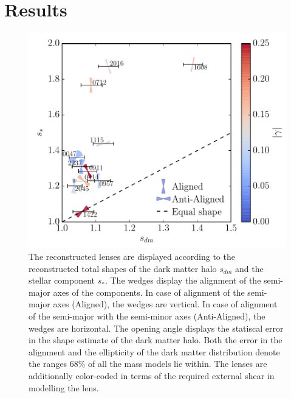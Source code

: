 \documentclass[useAMS,usenatbib]{mn2e}
\begin{document}
\section{Results}\label{sec:results}
\begin{figure}
  \centering
  \includegraphics[width=.8\linewidth]{Figures/wedges_shears.pdf}
  \caption[width=\linewidth]{The reconstructed lenses are displayed according to the reconstructed total shapes of the dark matter halo $s_{dm}$ and the stellar component $s_{*}$. The wedges display the alignment of the semi-major axes of the components. In case of alignment of the semi-major axes (Aligned), the wedges are vertical. In case of alignment of the semi-major with the semi-minor axes (Anti-Aligned), the wedges are horizontal. The opening angle displays the statiscal error in the shape estimate of the dark matter halo. Both the error in the alignment and the ellipticity of the dark matter distribution denote the ranges $68\%$ of all the mass models lie within. The lenses are additionally color-coded in terms of the required external shear in modelling the lens.}
  \label{fig:wedgesall}
\end{figure}
\end{document}
